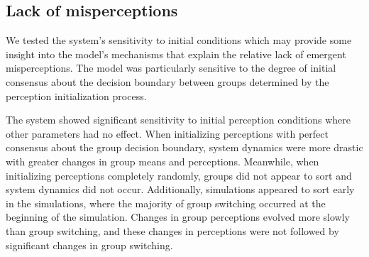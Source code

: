 \subsection{Lack of misperceptions}

We tested the system's sensitivity to initial conditions which may provide some insight into the model's mechanisms that explain the relative lack of emergent misperceptions. The model was particularly sensitive to the degree of initial consensus about the decision boundary between groups determined by the perception initialization process. 

The system showed significant sensitivity to initial perception conditions where other parameters had no effect. 
When initializing perceptions with perfect consensus about the group decision boundary, system dynamics were more drastic with greater changes in group means and perceptions. Meanwhile, when initializing perceptions completely randomly, groups did not appear to sort and system dynamics did not occur. Additionally, simulations appeared to sort early in the simulations, where the majority of group switching occurred at the beginning of the simulation. Changes in group perceptions evolved more slowly than group switching, and these changes in perceptions were not followed by significant changes in group switching. 



